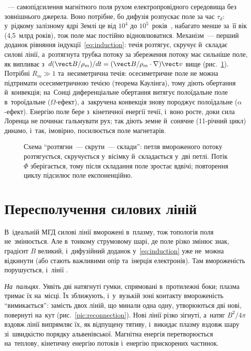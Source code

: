 ~--- самопідсилення магнітного поля рухом електропровідного середовища без зовнішнього джерела.
Воно потрібне, бо дифузія розпускає поле за час $\tau_d$: у~рідкому залізному ядрі Землі це від $10^4$ до $10^5$~років~\cite{roberts2013genesis}, набагато менше за~її вік
(4,5~млрд років), тож поле має постійно відновлюватися.
Механізм~--- перший доданок рівняння індукції~\eqref{eq:induction}: течія розтягує, скручує й~складає силові лінії, а~розтягнута трубка
потоку за збереження потоку має сильніше поле, як випливає з~$d(\vect B/\rho_m)/dt=(\vect B/\rho_m\cdot\nabla)\vect v$ вище (рис.~\ref{fig:dynamo-stf}).
Потрібні $R_m\gg1$ та~несиметрична течія: осесиметричне поле не можна підтримати осесиметричною течією (теорема Каулінга), тому діють обертання
й~конвекція; на~Сонці диференціальне обертання витягує полоїдальне поле в~тороїдальне ($\Omega$-ефект), а~закручена конвекція знову породжує полоїдальне ($\alpha$-ефект).
Енергію поле бере з~кінетичної енергії течії, і~воно росте, доки сила Лоренца не починає гальмувати рух; так діють земне й~сонячне
(11-річний цикл) динамо, і~так, імовірно, посилюється поле магнетарів.

\begin{figure}[ht]\centering
	\caption{Схема \enquote{розтягни~--- скрути~--- склади}: петля вмороженого потоку розтягується, скручується у~вісімку й~складається
	у~дві петлі. Потік $\Phi$ зберігається, тому після складання поле зростає вдвічі; повторення циклу підсилює поле експоненційно.}
	\label{fig:dynamo-stf}
\end{figure}

\section{Пересполучення силових ліній}\label{sec:reconnection}

В~ідеальній МГД силові лінії вморожені в~плазму, тож топологія поля не~змінюється. Але в~тонкому струмовому шарі,
де поле різко змінює знак, градієнт $B$ великий, і~дифузійний доданок у~\eqref{eq:induction} уже не~можна відкинути (або стають важливими опір та~інерція електронів). Там вмороженість порушується, і~лінії .

\emph{На~пальцях.} Уявіть дві натягнуті гумки, спрямовані в~протилежні боки; плазма тримає їх на~місці. Їх зближують, і~у~вузькій зоні контакту вмороженість \enquote{вимикається}:
замість двох ліній, що минали одна одну, утворюються дві нові, повернуті на~кут (рис.~\ref{pic:reconnection}). Нові лінії різко зігнуті, а~натяг $B^2/4\pi$ вздовж лінії
випрямляє їх, як відпущену тятиву, і~викидає плазму вздовж шару зі~швидкістю порядку альвенівської. Магнітна енергія перетворюється на~теплову, кінетичну енергію потоків
і~енергію прискорених частинок.

